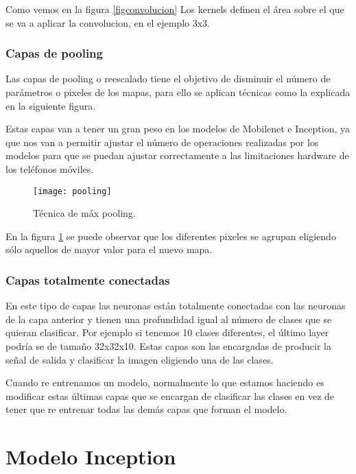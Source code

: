 Como vemos en la figura \ref{figconvolucion} Los kernels definen el área sobre el que se va a aplicar la convolucion, en el ejemplo 3x3.

\subsubsection{Capas de pooling}

Las capas de pooling o reescalado tiene el objetivo de disminuir el número de parámetros o pixeles de los mapas, para ello se aplican técnicas como la explicada en la siguiente figura.

Estas capas van a tener un gran peso en los modelos de Mobilenet e Inception, ya que nos van a permitir ajustar el número de operaciones realizadas por los modelos para que se puedan ajustar correctamente a las limitaciones hardware de los teléfonos móviles.

\begin{figure}[h]
    \begin{center}%
        \begin{center}%
          \texttt{[image: pooling]}%
          \caption{Técnica de máx pooling.}%
          \label{figpooling}%
        \end{center}%
  	\end{center}%
\end{figure}%

En la figura \ref{figpooling} se puede observar que los diferentes pixeles se agrupan eligiendo sólo aquellos de mayor valor para el nuevo mapa.

\subsubsection{Capas totalmente conectadas}

En este tipo de capas las neuronas están totalmente conectadas con las neuronas de la capa anterior y tienen una profundidad igual al número de clases que se quieran clasificar. Por ejemplo si tenemos 10 clases diferentes, el último layer podría se de tamaño 32x32x10. Estas capas son las encargadas de producir la señal de salida y clasificar la imagen eligiendo una de las clases. 

Cuando re entrenamos un modelo, normalmente lo que estamos haciendo es modificar estas últimas capas que se encargan de clasificar las clases en vez de tener que re entrenar todas las demás capas que forman el modelo.

\section{Modelo Inception}

